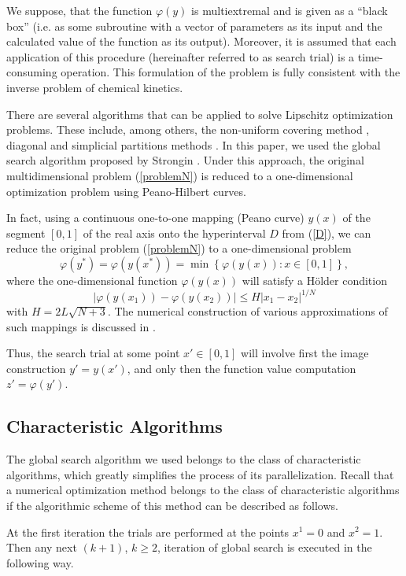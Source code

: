 \documentclass{svproc}
\begin{document}
We suppose, that the function $\varphi(y)$ is multiextremal and is given as a ``black box'' (i.e. as some subroutine with a vector of parameters as its input and the calculated value of the function as its output). Moreover, it is assumed that each application of this procedure (hereinafter referred to as search trial) is a time-consuming operation. This formulation of the problem is fully consistent with the inverse problem of chemical kinetics.

There are several algorithms that can be applied to solve Lipschitz optimization problems. These include, among others, the non-uniform covering method \cite{Evtushenko2009,Evtushenko2013}, diagonal and simplicial partitions methods \cite{Zilinskas2010,Paulavicius2011}. In this paper, we used the global search algorithm proposed by Strongin \cite{Strongin2000}. Under this approach, the original multidimensional problem (\ref{problemN}) is reduced to a one-dimensional optimization problem using Peano-Hilbert curves.

In fact, using a continuous one-to-one mapping (Peano curve) $y(x)$ of the segment $[0,1]$ of the real axis onto the hyperinterval $D$ from (\ref{D}), we can reduce the original problem (\ref{problemN}) to a one-dimensional problem
\[
\varphi(y^\ast)=\varphi(y(x^\ast))=\min{\left\{\varphi(y(x)): x\in[0,1]\right\}},
\]
where the one-dimensional function $\varphi(y(x))$ will satisfy a H{\"o}lder condition
\[
\left|\varphi(y(x_1))-\varphi(y(x_2))\right|\leq H\left|x_1-x_2\right|^{1/N}
\]
with $ H=2 L \sqrt{N+3}$.
The numerical construction of various approximations of such mappings is discussed in \cite{Sergeyev2013,Strongin2000}.

Thus, the search trial at some point $x'\in[0,1]$ will involve first the image construction $y'=y(x')$, and only then the function value computation $ z' = \varphi(y')$.

\subsection{Characteristic Algorithms}

The global search algorithm we used belongs to the class of characteristic algorithms, which greatly simplifies the process of its parallelization. Recall that a numerical optimization method belongs to the class of characteristic algorithms if the algorithmic scheme of this method can be described as follows.

At the first iteration the trials are performed at the points $x^1 = 0$ and $x^2 = 1$. Then any next $(k+1)$, $k \geq 2$, iteration of global search is executed in the following way.
\end{document}
